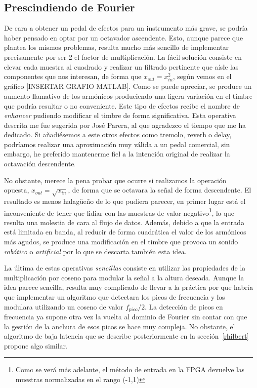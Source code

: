\subsection{Prescindiendo de Fourier}
\label{nofourier}
De cara a obtener un pedal de efectos para un instrumento más grave, se podría haber pensado en optar por un octavador ascendente. Esto, aunque parece que plantea los mismos problemas, resulta mucho más sencillo de implementar precisamente por ser 2 el factor de multiplicación. La fácil solución consiste en elevar cada muestra al cuadrado y realizar un filtrado pertinente que aísle las componentes que nos interesan, de forma que $x_{out} = x_{in}^{2}$, según vemos en el gráfico [INSERTAR GRAFIO MATLAB]. Como se puede apreciar, se produce un aumento llamativo de los armónicos produciendo una ligera variación en el timbre que podría resultar o no conveniente. Este tipo de efectos recibe el nombre de \emph{enhancer} pudiendo modificar el timbre de forma significativa. Esta operativa descrita me fue sugerida por José Parera, al que agradezco el tiempo que me ha dedicado. Si añadiésemos a este otros efectos como tremolo, reverb o delay, podríamos realizar una aproximación muy válida a un pedal comercial, sin embargo, he preferido mantenerme fiel a la intención original de realizar la octavación descendente.

No obstante, merece la pena probar que ocurre si realizamos la operación opuesta, $x_{out} = \sqrt{x_{in}}$, de forma que se octavara la señal de forma descendente. El resultado es menos halagüeño de lo que pudiera parecer, en primer lugar está el inconveniente de tener que lidiar con las muestras de valor negativo\footnote{Como se verá más adelante, el método de entrada en la FPGA devuelve las muestras normalizadas en el rango (-1,1)}, lo que resulta una molestia de cara al flujo de datos. Además, debido a que la entrada está limitada en banda, al reducir de forma cuadrática el valor de los armónicos más agudos, se produce una modificación en el timbre que provoca un sonido \emph{robótico} o \emph{artificial} por lo que se descarta también esta idea.

La última de estas operativas \emph{sencillas} consiste en utilizar las propiedades de la multiplicación por coseno para modular la señal a la altura deseada. Aunque la idea parece sencilla, resulta muy complicado de llevar a la práctica por que habría que implementar un algoritmo que detectara los picos de frecuencia y los modulara utilizando un coseno de valor $f_{pico}/2$. La detección de picos en frecuencia ya supone otra vez la vuelta al dominio de Fourier sin contar con que la gestión de la anchura de esos picos se hace muy compleja. No obstante, el algoritmo de baja latencia que se describe posteriormente en la sección~\ref{rhilbert} propone algo similar.

